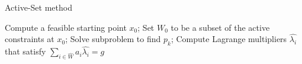 \begin{algorithm}
\caption{Active-Set method}
\begin{algorithmic}
\State Compute a feasible starting point $x_0$;
\State Set $W_0$ to be a subset of the active constraints at $x_0$;
	\State Solve subproblem to find $p_k$;
		\State Compute Lagrange multipliers $\hat{\lambda_i}$ that satisfy $\sum\limits_{i \in \hat{W}}$$a_i\hat{\lambda_i}=g$
	\EndIf
	
\EndFor
	
	
\EndProcedure
\end{algorithmic}
\end{algorithm}




